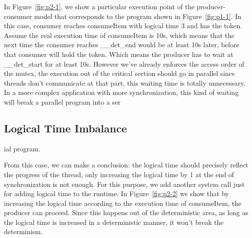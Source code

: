 \documentclass{sig-alternate}
\begin{document}
In Figure~\ref{fig:p2-1}, we show a particular execution point of the producer-consumer model that corresponds to the program shown in Figure~\ref{fig:p1-1}. In this case, consumer reaches consumeItem with logical time 3 and has the token. Assume the real execution time of consumeItem is 10s, which means that the next time the consumer reaches \_\_det\_end would be at least 10s later, before that consumer will hold the token. Which means the producer has to wait at \_\_det\_start for at least 10s. However we've already enforces the access order of the mutex, the execution out of the critical section should go in parallel since threads don't communicate at that part, this waiting time is totally unnecessary. In a more complex application with more synchronization, this kind of waiting will break a parallel program into a ser\subsection{Logical Time Imbalance}ial program.

From this case, we can make a conclusion: the logical time should precisely reflect the progress of the thread, only increasing the logical time by 1 at the end of synchronization is not enough. For this purpose, we add another system call just for adding logical time to the runtime. In Figure~\ref{fig:p2-2} we show that by increasing the logical time according to the execution time of consumeItem, the producer can proceed. Since this happens out of the deterministic area, as long as the logical time is increased in a deterministic manner, it won't break the determinism.
\end{document}
